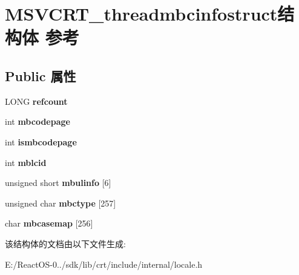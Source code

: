 \hypertarget{struct_m_s_v_c_r_t__threadmbcinfostruct}{}\section{M\+S\+V\+C\+R\+T\+\_\+threadmbcinfostruct结构体 参考}
\label{struct_m_s_v_c_r_t__threadmbcinfostruct}
\subsection*{Public 属性}
\begin{DoxyCompactItemize}
\item 
\mbox{\label{struct_m_s_v_c_r_t__threadmbcinfostruct_af56e55c8d261dc61db148130a122e9f3}} 
L\+O\+NG {\bfseries refcount}
\item 
\mbox{\label{struct_m_s_v_c_r_t__threadmbcinfostruct_ab13b32c01592d6fbd218d619f5f0ae88}} 
int {\bfseries mbcodepage}
\item 
\mbox{\label{struct_m_s_v_c_r_t__threadmbcinfostruct_a0f577e55f8e2aab757db603d48d183d3}} 
int {\bfseries ismbcodepage}
\item 
\mbox{\label{struct_m_s_v_c_r_t__threadmbcinfostruct_ab69ba13994e7069097a59c2015c98a15}} 
int {\bfseries mblcid}
\item 
\mbox{\label{struct_m_s_v_c_r_t__threadmbcinfostruct_a8721f6b5b68a0b531cc741cb4509afc4}} 
unsigned short {\bfseries mbulinfo} \mbox{[}6\mbox{]}
\item 
\mbox{\label{struct_m_s_v_c_r_t__threadmbcinfostruct_a46731c7bc94420e674b0799ff1953bc9}} 
unsigned char {\bfseries mbctype} \mbox{[}257\mbox{]}
\item 
\mbox{\label{struct_m_s_v_c_r_t__threadmbcinfostruct_acf473f2c8e123f87ba772f80f681f742}} 
char {\bfseries mbcasemap} \mbox{[}256\mbox{]}
\end{DoxyCompactItemize}


该结构体的文档由以下文件生成\+:\begin{DoxyCompactItemize}
\item 
E\+:/\+React\+O\+S-\/0../sdk/lib/crt/include/internal/locale.\+h\end{DoxyCompactItemize}
